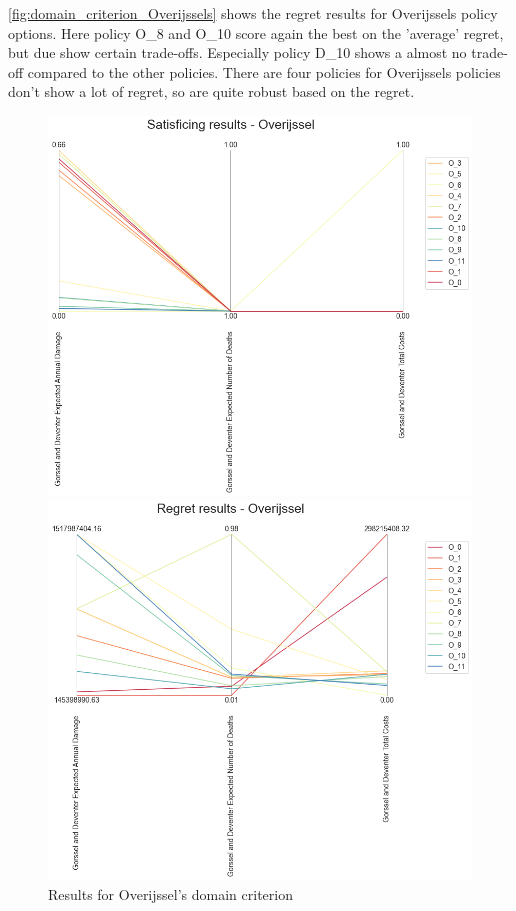 \noindent \autoref{fig:domain_criterion_Overijssels} shows the regret results for Overijssels policy options. Here policy O\_8 and O\_10 score again the best on the 'average' regret, but due show certain trade-offs. Especially policy D\_10 shows a almost no trade-off compared to the other policies. There are four policies for Overijssels policies don't show a lot of regret, so are quite robust based on the regret.

\begin{figure}[H]
  \centering
  \begin{minipage}[b]{0.4\textwidth}
    \includegraphics[width=1.2\textwidth]{report/figures/results/domain_criterion_Overijssel.png}
    \caption{Results for Overijssel's domain criterion}
    \label{fig:domain_criterion_Overijssels}
  \end{minipage}
  \hfill
  \begin{minipage}[b]{0.4\textwidth}
    \includegraphics[width=1.2\textwidth]{report/figures/results/regret_figure_Overijssel.png}

\end{minipage}
\end{figure}
